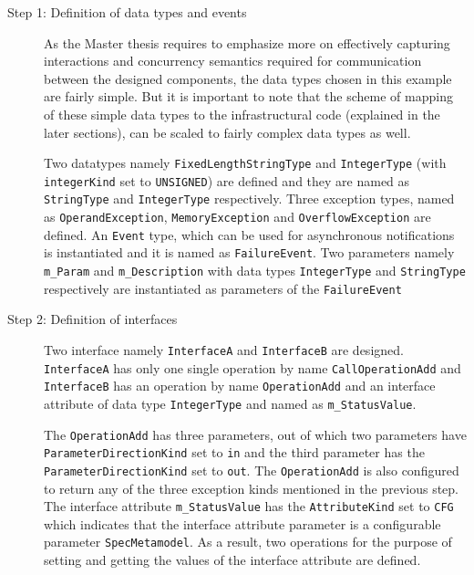 \begin{description}
\item [Step 1: Definition of data types and events] As the Master thesis requires to emphasize more on effectively capturing interactions and concurrency semantics required for communication between the designed components, the data types chosen in this example are fairly simple. But it is important to note that the scheme of mapping of these simple data types to the infrastructural code (explained in the later sections), can be scaled to fairly complex data types as well.

Two datatypes namely \texttt{Fixed\allowbreak Length\allowbreak String\allowbreak Type} and \texttt{Integer\allowbreak Type} (with \texttt{integer\allowbreak Kind} set to \texttt{UNSIGNED}) are defined and they are named as \texttt{StringType} and \texttt{IntegerType} respectively. Three exception types, named as \texttt{OperandException}, \texttt{MemoryException} and \texttt{Overflow\allowbreak Exception} are defined. An \texttt{Event} type, which can be used for asynchronous notifications \cite{SpecMetamodel} is instantiated and it is named as \texttt{FailureEvent}. Two parameters namely \texttt{m\_Param} and \texttt{m\_Description} with data types \texttt{IntegerType} and \texttt{StringType} respectively are instantiated as parameters of the \texttt{FailureEvent}

\item [Step 2: Definition of interfaces] Two interface namely \texttt{InterfaceA} and \texttt{InterfaceB} are designed. \texttt{InterfaceA} has only one single operation by name \texttt{CallOperationAdd} and \texttt{InterfaceB} has an operation by name \texttt{OperationAdd} and an interface attribute of data type \texttt{IntegerType} and named as \texttt{m\_StatusValue}.

The \texttt{OperationAdd} has three parameters, out of which two parameters have \texttt{Parameter\allowbreak Direction\allowbreak Kind} set to \texttt{in} and the third parameter has the \texttt{Parameter\allowbreak Direction\allowbreak Kind} set to \texttt{out}. The \texttt{OperationAdd} is also configured to return any of the three exception kinds mentioned in the previous step. The interface attribute \texttt{m\_StatusValue} has the \texttt{AttributeKind} set to \texttt{CFG} which indicates that the interface attribute parameter is a configurable parameter \texttt{SpecMetamodel}. As a result, two operations for the purpose of setting and getting the values of the interface attribute are defined.   


\end{description}
